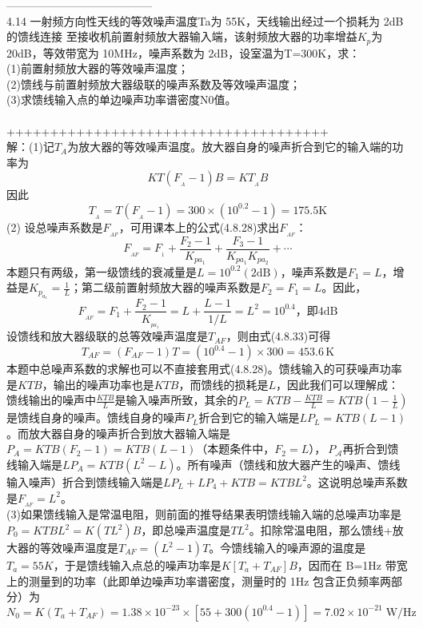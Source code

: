 \documentclass[utf8]{article}
\begin{document}
---------------------------------------\\
4.14 一射频方向性天线的等效噪声温度Ta为 55K，天线输出经过一个损耗为 2dB的馈线连接
至接收机前置射频放大器输入端，该射频放大器的功率增益$K_{p}$为 20dB，等效带宽为 10MHz，噪声系数为 2dB，设室温为T=300K，求：\\
(1)前置射频放大器的等效噪声温度；\\ 
(2)馈线与前置射频放大器级联的噪声系数及等效噪声温度； \\
(3)求馈线输入点的单边噪声功率谱密度N0值。\\
\\
+++++++++++++++++++++++++++++++++++++\\
解：(1)记$\textstyle T_{\scriptscriptstyle A}$为放大器的等效噪声温度。放大器自身的噪声折合到它的输入端的功率为
$$K T\left(F_{_A}-1\right)B=K T_{_A}B$$
因此
$$T_{_A}=T\left(F_{_A}-1\right)=300\times\left(10^{0.2}-1\right)=175.5\mathrm{K}$$
(2) 设总噪声系数是$F_{_{A F}}$，可用课本上的公式(4.8.28)求出$F_{_{A F}}$：
$$F_{_{A F}}=F_{_1}+{\frac{F_{2}-1}{K_{p a_{1}}}}+{\frac{F_{3}-1}{K_{p a_{1}}K_{p a_{2}}}}+\cdots$$
本题只有两级，第一级馈线的衰减量是${L}=10^{0.2}\left(2\mathrm{dB}\right)$，噪声系数是$F_{1}=L$，增益是$K_{p_{a_{1}}}={\frac{1}{L}}$；第二级前置射频放大器的噪声系数是$F_{2}=F_{1}=L$。因此，
$$F_{_{A F}}=F_{1}+{\frac{F_{2}-1}{K_{_{p a_{1}}}}}=L+{\frac{L-1}{1/L}}=L^{2}=10^{0.4}\text{，即4dB}$$
设馈线和放大器级联的总等效噪声温度是$T_{\mathit{A F}}$，则由式(4.8.33)可得
$$T_{A F}=\left(F_{AF}-1\right)T=\left(10^{0.4}-1\right)\times300=453.6\,\mathrm{K}$$
本题中总噪声系数的求解也可以不直接套用式(4.8.28)。馈线输入的可获噪声功率是$K T B$，输出的噪声功率也是$K T B$，而馈线的损耗是$\boldsymbol{\mathit{L}}$，因此我们可以理解成：馈线输出的噪声中$\frac{K T B}{L}$是输入噪声所致，其余的$P_{L}=K T B-\frac{K T B}{L}=K T B\left(1-\frac{1}{L}\right)$是馈线自身的噪声。馈线自身的噪声$P_{L}$折合到它的输入端是$L P_{L}=K T B\left(L-1\right)$。而放大器自身的噪声折合到放大器输入端是$P_{A}=K T B\left(F_{2}-1\right)=K T B\left(L-1\right)$（本题条件中，$F_{2}=L$），$\ P_{\mathcal{A}}$再折合到馈线输入端是$L P_{A}=K T B\left(L^{2}-L\right)$。所有噪声（馈线和放大器产生的噪声、馈线输入噪声）折合到馈线输入端是$L P_{L}+L P_{4}+K T B=K T B L^{2}$。这说明总噪声系数是$F_{_{A F}}=L^{2}$。\\
(3)如果馈线输入是常温电阻，则前面的推导结果表明馈线输入端的总噪声功率是$P_{0}=K T B L^{2}=K\left(T L^{2}\right)B$，即总噪声温度是$T L_{}^{2}$。扣除常温电阻，那么馈线+放大器的等效噪声温度是$T_{A F}=\left(L^{2}-1\right)T$。今馈线输入的噪声源的温度是$T_{a}=55 K$，于是馈线输入点总的噪声功率是$K\left[T_{a}+T_{A F}\right]B$，因而在 B=1Hz 带宽上的测量到的功率（此即单边噪声功率谱密度，测量时的 1Hz 包含正负频率两部分）为
$$N_{0}=K\left(T_{a}+T_{A F}\right)=1.38\times10^{-23}\times\left[55+300\left(10^{0.4}-1\right)\right]=7.02\times10^{-21}\operatorname{W/Hz}$$
\end{document}
